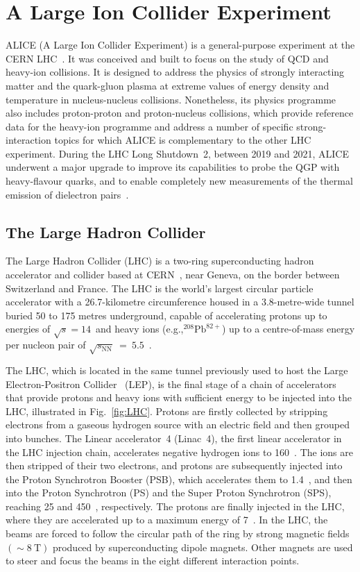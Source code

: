 \chapter{A Large Ion Collider Experiment}\label{chap:ALICE}

ALICE  (A Large Ion Collider Experiment) is a general-purpose experiment at the CERN LHC~\cite{ALICE:2008ngc}. It was conceived and built to focus on the study of QCD and heavy-ion collisions. It is designed to address the physics of strongly interacting matter and the quark-gluon plasma at extreme values of energy density and temperature in nucleus-nucleus collisions. Nonetheless, its physics programme also includes proton-proton and proton-nucleus collisions, which provide reference data for the heavy-ion programme and address a number of specific strong-interaction topics for which ALICE is complementary to the other LHC experiment. During the LHC Long Shutdown~2, between 2019 and 2021, ALICE underwent a major upgrade to improve its capabilities to probe the QGP with heavy-flavour quarks, and to enable completely new measurements of the thermal emission of dielectron pairs~\cite{ALICE:2023udb}.


\section{The Large Hadron Collider}
\begin{sloppypar}
The Large Hadron Collider (LHC) is a two-ring superconducting hadron accelerator and collider based at CERN~\cite{Evans:2008zzb}, near Geneva, on the border between Switzerland and France. The LHC is the world's largest circular particle accelerator with a 26.7-kilometre circumference housed in a 3.8-metre-wide tunnel buried 50 to 175 metres underground, capable of accelerating protons up to energies of ${\sqrt{s} = 14}$~\tev and heavy ions (e.g.,${}^{208}\mathrm{Pb}^{82+}$) up to a centre-of-mass energy per nucleon pair of $\sqrt{s_\mathrm{NN}}~=~5.5$~\tev. 
\end{sloppypar}
The LHC, which is located in the same tunnel previously used to host the Large Electron-Positron Collider~\cite{Myers:1991ym} (LEP), is the final stage of a chain of accelerators that provide protons and heavy ions with sufficient energy to be injected into the LHC, illustrated in Fig.~\ref{fig:LHC}. Protons are firstly collected by stripping electrons from a gaseous hydrogen source with an electric field and then grouped into bunches. The Linear accelerator~4 (Linac~4), the first linear accelerator in the LHC injection chain, accelerates negative hydrogen ions to 160~\mev. The ions are then stripped of their two electrons, and protons are subsequently injected into the Proton Synchrotron Booster (PSB), which accelerates them to 1.4~\gev, and then into the Proton Synchrotron (PS) and the Super Proton Synchrotron (SPS), reaching 25 and 450~\gev, respectively. The protons are finally injected in the LHC, where they are accelerated up to a maximum energy of 7~\tev. In the LHC, the beams are forced to follow the circular path of the ring by strong magnetic fields $(\sim 8~\mathrm{T})$ produced by superconducting dipole magnets. Other magnets are used to steer and focus the beams in the eight different interaction points. 

